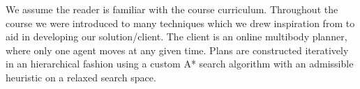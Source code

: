 We assume the reader is familiar with the course curriculum.
Throughout the course we were introduced to many techniques which we drew inspiration from to aid in developing our solution/client.
The client is an online multibody planner, where only one agent moves at any given time.
Plans are constructed iteratively in an hierarchical fashion using a custom A* search algorithm with an admissible heuristic on a relaxed search space.~\cite{russell2009modern,geffner2013concise} 
